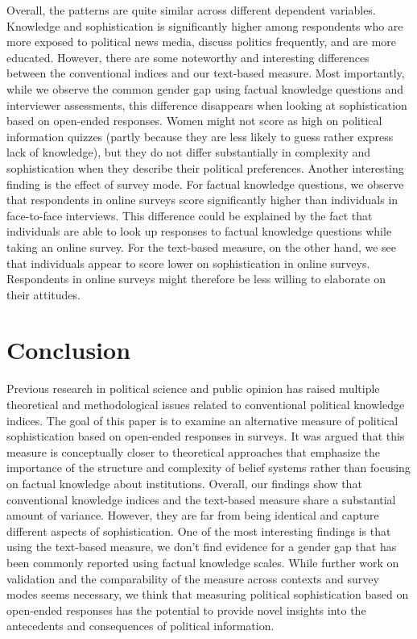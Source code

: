 \documentclass[12pt]{article}
\begin{document}
Overall, the patterns are quite similar across different dependent variables. Knowledge and sophistication is significantly higher among respondents who are more exposed to political news media, discuss politics frequently, and are more educated. However, there are some noteworthy and interesting differences between the conventional indices and our text-based measure. Most importantly, while we observe the common gender gap using factual knowledge questions and interviewer assessments, this difference disappears when looking at sophistication based on open-ended responses. Women might not score as high on political information quizzes (partly because they are less likely to guess rather express lack of knowledge), but they do not differ substantially in complexity and sophistication when they describe their political preferences. Another interesting finding is the effect of survey mode. For factual knowledge questions, we observe that respondents in online surveys score significantly higher than individuals in face-to-face interviews. This difference could be explained by the fact that individuals are able to look up responses to factual knowledge questions while taking an online survey. For the text-based measure, on the other hand, we see that individuals appear to score lower on sophistication in online surveys. Respondents in online surveys might therefore be less willing to elaborate on their attitudes.


\section{Conclusion}

Previous research in political science and public opinion has raised multiple theoretical and methodological issues related to conventional political knowledge indices. The goal of this paper is to examine an alternative measure of political sophistication based on open-ended responses in surveys. It was argued that this measure is conceptually closer to theoretical approaches that emphasize the importance of the structure and complexity of belief systems rather than focusing on factual knowledge about institutions. Overall, our findings show that conventional knowledge indices and the text-based measure share a substantial amount of variance. However, they are far from being identical and capture different aspects of sophistication. One of the most interesting findings is that using the text-based measure, we don't find evidence for a gender gap that has been commonly reported using factual knowledge scales. While further work on validation and the comparability of the measure across contexts and survey modes seems necessary, we think that measuring political sophistication based on open-ended responses has the potential to provide novel insights into the antecedents and consequences of political information.
\end{document}
